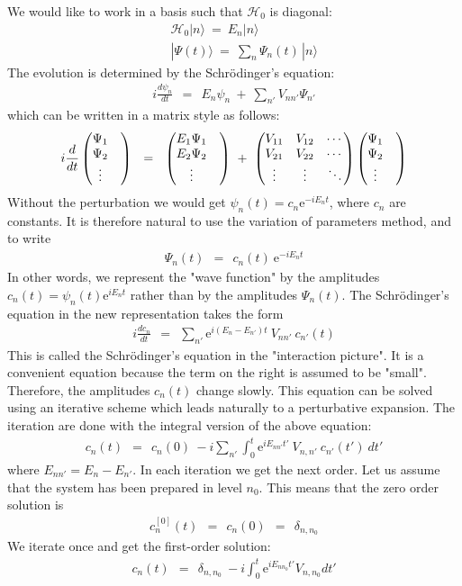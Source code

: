 \documentclass[onecolumn,fleqn]{revtex4}
\newcommand{\eexp}{\mathrm{e}^}
\newcommand{\amatrix}[1]{\begin{matrix} #1 \end{matrix}}
\newcommand{\beq}{\begin{eqnarray}}
\newcommand{\eeq}{\end{eqnarray}}
\begin{document}
We would like to work in a basis 
such that ${\mathcal{H}_0}$ is diagonal:
\beq
&& \mathcal{H}_0 |n \rangle \ = \  E_n |n \rangle
\\ \nonumber
&& |\Psi(t)\rangle \ = \ \sum_{n}\Psi_n(t) \, |n\rangle 
\eeq
The evolution is determined by the Schr\"{o}dinger's equation:
\beq
i\frac{d\psi_n}{dt} \ \ = \ \ E_n\psi_n \ + \ \sum_{n'} V_{nn'} \Psi_{n' }
\eeq
which can be written in a matrix style as follows:
\beq
i\frac{d}{dt} \left(\amatrix{ \Psi_1& \cr \Psi_2 \cr \vdots } \right)
\ \ = \ \ 
\left(\amatrix{ E_1\Psi_1& \cr E_2 \Psi_2 \cr \vdots } \right)
\ + \  
\left(
\amatrix{
V_{11} & V_{12} & \cdots \cr 
V_{21} & V_{22} & \cdots \cr 
\vdots & \vdots &\ddots } 
\right) 
\left(\amatrix{ \Psi_1& \cr \Psi_2 \cr \vdots } \right) 
\eeq
Without the perturbation we would 
get ${\psi_n(t)= c_n \eexp{-iE_n t}}$, 
where ${c_n}$ are constants.  
It is therefore natural to use 
the variation of parameters method, 
and to write 
\beq
\Psi_n(t) \ \ = \ \ c_n(t) \ \eexp{-iE_n t} 
\eeq
In other words, we represent the "wave function" 
by the amplitudes ${ c_n(t) = \psi_n(t) \eexp{iE_n t}}$ 
rather than by the amplitudes $\Psi_n(t)$. 
The Schr\"{o}dinger's equation in the new 
representation takes the form  
\beq
i\frac{d c_n}{dt} \ \ = \ \ \sum_{n'} \eexp{i(E_{n}-E_{n'})t} \ V_{nn'} \ c_{n'}(t) 
\eeq
This is called the Schr\"{o}dinger's equation 
in the "interaction picture". It is a convenient 
equation because the term on the right 
is assumed to be "small". Therefore, the amplitudes ${c_n(t)}$ change 
slowly. This equation can be solved using 
an iterative scheme which leads naturally 
to a perturbative expansion. The iteration are done 
with  the integral version of the above equation:
\beq
c_n(t)\ \ = \ \  c_n(0) \ - i \sum_{n'} \int_0^{t} 
\eexp{i E_{nn'} t'} \ V_{n,n'} \ c_{n'}(t') \ dt' 
\eeq
where ${ E_{nn'} = E_n-E_{n'} }$. In each iteration we get 
the next order. Let us assume that the system has 
been prepared in level $n_0$. This means that the zero 
order solution is 
\beq
c_n^{[0]}(t) \ \  = \ \  c_{n}(0) \ \ =\ \  \delta_{n,n_0 } 
\eeq
We iterate once and get the first-order solution:
\beq
c_n(t) \ \ = \ \ \delta_{n,n_0} \ - i\int_0^t \eexp{iE_{nn_0} t'} V_{n,n_0} dt'
\eeq
\end{document}
